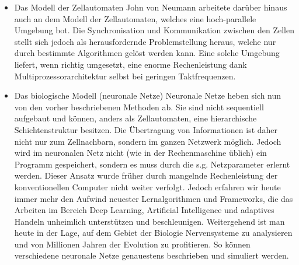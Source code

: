 \begin{itemize}
		\item Das Modell der Zellautomaten
			\subitem John von Neumann arbeitete darüber hinaus auch an dem Modell der Zellautomaten, welches eine hoch-parallele Umgebung bot. Die Synchronisation und Kommunikation zwischen den Zellen stellt sich jedoch als herausfordernde Problemstellung heraus, welche nur durch bestimmte Algorithmen gelöst werden kann. Eine solche Umgebung liefert, wenn richtig umgesetzt, eine enorme Rechenleistung dank Multiprozessorarchitektur selbst bei geringen Taktfrequenzen.
		\item Das biologische Modell (neuronale Netze)
			\subitem Neuronale Netze heben sich nun von den vorher beschriebenen Methoden ab. Sie sind nicht sequentiell aufgebaut und können, anders als Zellautomaten, eine hierarchische Schichtenstruktur besitzen. Die Übertragung von Informationen ist daher nicht nur zum Zellnachbarn,  sondern im ganzen Netzwerk möglich. Jedoch wird im neuronalen Netz nicht (wie in der Rechenmaschine üblich) ein Programm gespeichert, sondern es muss durch die s.g. Netzparameter erlernt werden. Dieser Ansatz wurde früher durch mangelnde Rechenleistung der konventionellen Computer nicht weiter verfolgt. Jedoch erfahren wir heute immer mehr den Aufwind neuester Lernalgorithmen und Frameworks, die das Arbeiten im Bereich Deep Learning, Artificial Intelligence und adaptives Handeln unheimlich unterstützen und beschleunigen. Weitergehend ist man heute in der Lage, auf dem Gebiet der Biologie Nervensysteme zu analysieren und von Millionen Jahren der Evolution zu profitieren. So können verschiedene neuronale Netze genauestens beschrieben und simuliert werden.
	\end{itemize}
